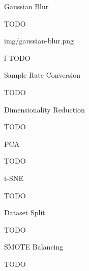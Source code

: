 \secc Gaussian Blur

TODO

\midinsert {}
\picw=15cm \cinspic img/gaussian-blur.png
\caption/f TODO
\endinsert

\sec Sample Rate Conversion

TODO

\sec Dimensionality Reduction

TODO

\secc PCA

TODO

\secc t-SNE

TODO

\sec Dataset Split

TODO

\sec SMOTE Balancing

TODO
